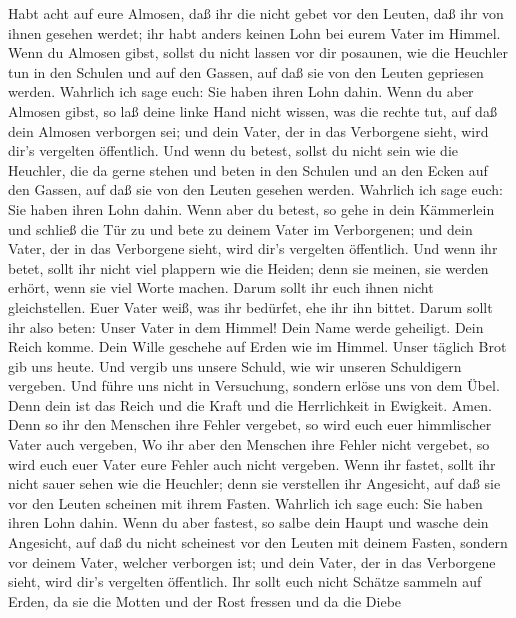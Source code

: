  Habt acht auf eure Almosen, daß ihr die nicht gebet vor den
Leuten, daß ihr von ihnen gesehen werdet; ihr habt anders keinen Lohn
bei eurem Vater im Himmel.  Wenn du Almosen gibst, sollst du
nicht lassen vor dir posaunen, wie die Heuchler tun in den Schulen und
auf den Gassen, auf daß sie von den Leuten gepriesen werden. Wahrlich
ich sage euch: Sie haben ihren Lohn dahin.  Wenn du aber
Almosen gibst, so laß deine linke Hand nicht wissen, was die rechte tut,
 auf daß dein Almosen verborgen sei; und dein Vater, der in
das Verborgene sieht, wird dir's vergelten öffentlich.  Und
wenn du betest, sollst du nicht sein wie die Heuchler, die da gerne
stehen und beten in den Schulen und an den Ecken auf den Gassen, auf daß
sie von den Leuten gesehen werden. Wahrlich ich sage euch: Sie haben
ihren Lohn dahin.  Wenn aber du betest, so gehe in dein
Kämmerlein und schließ die Tür zu und bete zu deinem Vater im
Verborgenen; und dein Vater, der in das Verborgene sieht, wird dir's
vergelten öffentlich.  Und wenn ihr betet, sollt ihr nicht
viel plappern wie die Heiden; denn sie meinen, sie werden erhört, wenn
sie viel Worte machen.  Darum sollt ihr euch ihnen nicht
gleichstellen. Euer Vater weiß, was ihr bedürfet, ehe ihr ihn bittet.
 Darum sollt ihr also beten: Unser Vater in dem Himmel! Dein
Name werde geheiligt.  Dein Reich komme. Dein Wille
geschehe auf Erden wie im Himmel.  Unser täglich Brot gib
uns heute.  Und vergib uns unsere Schuld, wie wir unseren
Schuldigern vergeben.  Und führe uns nicht in Versuchung,
sondern erlöse uns von dem Übel. Denn dein ist das Reich und die Kraft
und die Herrlichkeit in Ewigkeit. Amen.  Denn so ihr den
Menschen ihre Fehler vergebet, so wird euch euer himmlischer Vater auch
vergeben,  Wo ihr aber den Menschen ihre Fehler nicht
vergebet, so wird euch euer Vater eure Fehler auch nicht vergeben.
 Wenn ihr fastet, sollt ihr nicht sauer sehen wie die
Heuchler; denn sie verstellen ihr Angesicht, auf daß sie vor den Leuten
scheinen mit ihrem Fasten. Wahrlich ich sage euch: Sie haben ihren Lohn
dahin.  Wenn du aber fastest, so salbe dein Haupt und
wasche dein Angesicht,  auf daß du nicht scheinest vor den
Leuten mit deinem Fasten, sondern vor deinem Vater, welcher verborgen
ist; und dein Vater, der in das Verborgene sieht, wird dir's vergelten
öffentlich.  Ihr sollt euch nicht Schätze sammeln auf
Erden, da sie die Motten und der Rost fressen und da die Diebe
